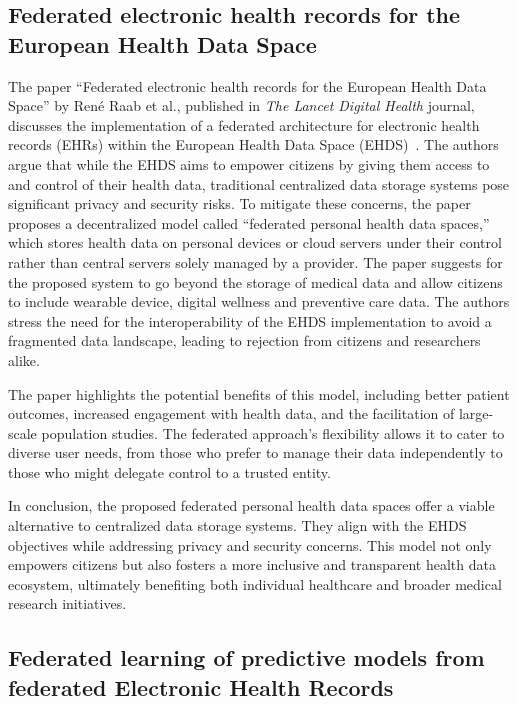 \subsection{Federated electronic health records for the European Health Data Space}\label{subsec:federated-electronic-health-records-for-the-european-health-data-space}

The paper ``Federated electronic health records for the European Health Data Space'' by René Raab et al., published in \textit{The Lancet Digital Health} journal, discusses the implementation of a federated architecture for electronic health records (EHRs) within the European Health Data Space (EHDS)~\cite{raab_federated_2023}.
The authors argue that while the EHDS aims to empower citizens by giving them access to and control of their health data, traditional centralized data storage systems pose significant privacy and security risks.
To mitigate these concerns, the paper proposes a decentralized model called ``federated personal health data spaces,'' which stores health data on personal devices or cloud servers under their control rather than central servers solely managed by a provider.
The paper suggests for the proposed system to go beyond the storage of medical data and allow citizens to include wearable device, digital wellness and preventive care data.
The authors stress the need for the interoperability of the EHDS implementation to avoid a fragmented data landscape, leading to rejection from citizens and researchers alike.

The paper highlights the potential benefits of this model, including better patient outcomes, increased engagement with health data, and the facilitation of large-scale population studies.
The federated approach's flexibility allows it to cater to diverse user needs, from those who prefer to manage their data independently to those who might delegate control to a trusted entity.

In conclusion, the proposed federated personal health data spaces offer a viable alternative to centralized data storage systems.
They align with the EHDS objectives while addressing privacy and security concerns.
This model not only empowers citizens but also fosters a more inclusive and transparent health data ecosystem, ultimately benefiting both individual healthcare and broader medical research initiatives.

\subsection{Federated learning of predictive models from federated Electronic Health Records}\label{subsec:federated-learning-of-predictive-models-from-federated-electronic-health-records}

